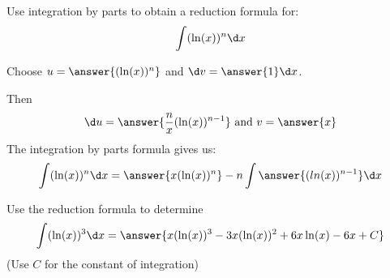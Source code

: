 \documentclass{ximera}
\author{Jason Miller}
\begin{document}
\begin{exercise}

Use integration by parts to obtain a reduction formula for:
\[
\int (\ln(x))^{n} \d x
\]


Choose $u=\answer{( \ln(x) )^{n} }$ and $\d v=\answer{1} \d x$.

Then
\[ \d u=\answer{\frac{n}{x}( \ln(x) )^{n-1}} \textrm{  and  } v=\answer{x}
\]
The integration by parts formula gives us:
\[
\int ( \ln(x) )^{n} \d x=\answer{x (\ln(x))^{n}} - n \int \answer{(ln(x))^{n-1}} \d x
\]

Use the reduction formula to determine 
\[
\int ( \ln(x))^{3} \d x=\answer{x(\ln(x))^{3} -3x (\ln(x))^{2} + 6x \ln(x) -6x +C }
\]
(Use $C$ for the constant of integration)

\end{exercise}
\end{document}
